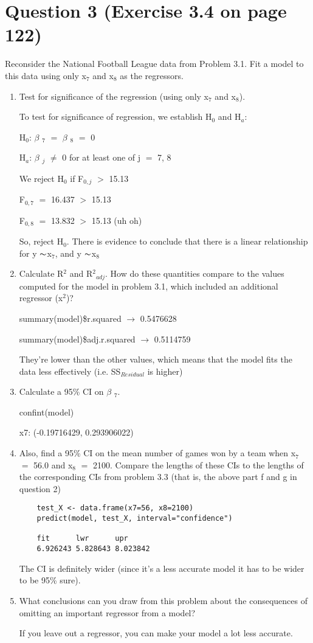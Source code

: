 \documentclass{article}
\newcommand{\mt}[1]{\ensuremath{#1}}
\newcommand\bsc[2][\DefaultOpt]{%
  \def\DefaultOpt{#2}%
  \section[#1]{#2}%
}
\newcommand{\balist}{\begin{enumerate}[label=\alph*.]}
\newcommand{\elist}{\end{enumerate}}
\newcommand{\bta}{\mt{\beta} }
\newcommand{\lra}{ \mt{\longrightarrow} } %
\newcommand{\gr}{\mt{\operatorname{>}} }
\newcommand{\eql}{ \mt{\operatorname{=}} }
\newcommand{\uw}[2]{#1\mt{_{#2}}}
\newcommand{\uf}[2]{#1\mt{^{#2}}}
\newcommand{\tl}{\mt{\thicksim}}
\begin{document}
\bsc{Question 3 (Exercise 3.4 on page 122)}{
Reconsider the National Football League data from Problem 3.1. Fit a model to this data using only \uw{x}{7} and \uw{x}{8} as the regressors.
\balist
\item Test for significance of the regression (using only \uw{x}{7} and \uw{x}{8}).

	To test for significance of regression, we establish \uw{H}{0} and \uw{H}{a}:

	\uw{H}{0}: \uw{\bta}{7} \eql \uw{\bta}{8} \eql 0 

	\uw{H}{a}: \uw{\bta}{j} $\neq$ 0 for at least one of j \eql 7, 8

	We reject \uw{H}{0} if \uw{F}{0, j} \gr 15.13
	
	\uw{F}{0, 7} \eql 16.437 \gr 15.13

	\uw{F}{0, 8} \eql 13.832 \gr 15.13 (uh oh)

	So, reject \uw{H}{0}. There is evidence to conclude that there is a linear relationship for y \tl \uw{x}{7}, and y \tl \uw{x}{8}
	
	
\item Calculate \uf{R}{2} and \uw{\uf{R}{2}}{adj}. How do these quantities compare to the values computed for the model in problem 3.1, which included an additional regressor (\uf{x}{2})?
	
	summary(model)\$r.squared \lra 0.5476628
	
	summary(model)\$adj.r.squared \lra 0.5114759
	
	They're lower than the other values, which means that the model fits the data less effectively (i.e. SS$_{Residual}$ is higher)
	
\item Calculate a 95\% CI on \uw{\bta}{7}.

	confint(model)
	
	x7: (-0.19716429,  0.293906022)
	
\newpage
	
\item Also, find a 95\% CI on the mean number of games won by a team when \uw{x}{7} \eql 56.0 and \uw{x}{8} \eql 2100. Compare the lengths of these CIs to the lengths of the corresponding CIs from problem 3.3 (that is, the above part f and g in question 2)
	\begin{verbatim}
	test_X <- data.frame(x7=56, x8=2100)
	predict(model, test_X, interval="confidence")
    
    fit      lwr      upr
	6.926243 5.828643 8.023842
	\end{verbatim}
	
	The CI is definitely wider (since it's a less accurate model it has to be wider to be 95\% sure).
	
\item What conclusions can you draw from this problem about the consequences of omitting an important regressor from a model?
	
	If you leave out a regressor, you can make your model a lot less accurate.
\elist
}
\end{document}
